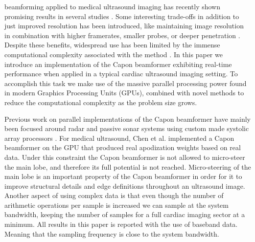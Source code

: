 \documentclass[12pt,journal,onecolumn]{IEEEtran}
\begin{document}
 beamforming \cite{Capon1969} applied to medical ultrasound imaging has recently shown promising results in several studies \cite{Synnevag2007, Austeng2008, Vignon2008, Viola, Mehdizadeh2012}. Some interesting trade-offs in addition to just improved resolution has been introduced, like maintaining image resolution in combination with higher framerates, smaller probes, or deeper penetration \cite{Synnevag2009}. Despite these benefits, widespread use has been limited by the immense computational complexity associated with the method \cite{So2011}. In this paper we introduce an implementation of the Capon beamformer exhibiting real-time performance when applied in a typical cardiac ultrasound imaging setting. To accomplish this task we make use of the massive parallel processing power found in modern Graphics Processing Units (GPUs), combined with novel methods to reduce the computational complexity as the problem size grows. 

Previous work on parallel implementations of the Capon beamformer have mainly been focused around radar and passive sonar systems using custom made systolic array processors \cite{McWhirter1989, Moonen1993, Sinha2002}. For medical ultrasound, Chen et al. \cite{Chen2011a, Chen2011, Chen} implemented a Capon beamformer on the GPU that produced real apodization weights based on real data. Under this constraint the Capon beamformer is not allowed to micro-steer the main lobe, and therefore its full potential is not reached. Micro-steering of the main lobe is an important property of the Capon beamformer in order for it to improve structural details and edge definitions throughout an ultrasound image. Another aspect of using complex data is that even though the number of arithmetic operations per sample is increased we can sample at the system bandwidth, keeping the number of samples for a full cardiac imaging sector at a minimum. All results in this paper is reported with the use of baseband data. Meaning that the sampling frequency is close to the system bandwidth. 

\end{document}
